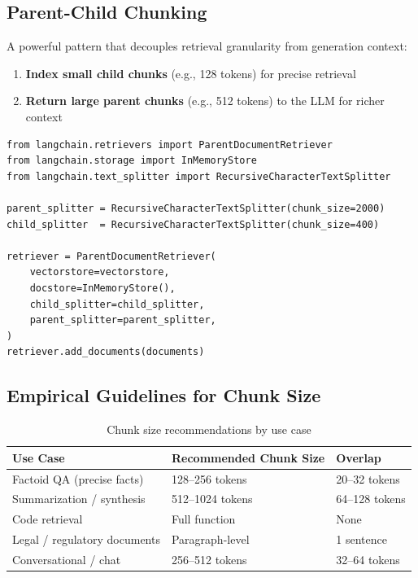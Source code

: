 \subsection{Parent-Child Chunking}
\label{parent-child-chunking}

A powerful pattern that decouples retrieval granularity from generation context:

\begin{enumerate}
  \item \textbf{Index small child chunks} (e.g., 128 tokens) for precise retrieval
  \item \textbf{Return large parent chunks} (e.g., 512 tokens) to the LLM for richer context
\end{enumerate}

\begin{lstlisting}[style=pythonstyle, caption={Parent-child chunking with LangChain}]
from langchain.retrievers import ParentDocumentRetriever
from langchain.storage import InMemoryStore
from langchain.text_splitter import RecursiveCharacterTextSplitter

parent_splitter = RecursiveCharacterTextSplitter(chunk_size=2000)
child_splitter  = RecursiveCharacterTextSplitter(chunk_size=400)

retriever = ParentDocumentRetriever(
    vectorstore=vectorstore,
    docstore=InMemoryStore(),
    child_splitter=child_splitter,
    parent_splitter=parent_splitter,
)
retriever.add_documents(documents)
\end{lstlisting}

\subsection{Empirical Guidelines for Chunk Size}
\label{empirical-guidelines-for-chunk-size}

\begin{table}[ht!]
\centering
\caption{Chunk size recommendations by use case}
\begin{tabular}{@{}lll@{}}
\toprule
\textbf{Use Case} & \textbf{Recommended Chunk Size} & \textbf{Overlap} \\
\midrule
Factoid QA (precise facts) & 128--256 tokens & 20--32 tokens \\
Summarization / synthesis & 512--1024 tokens & 64--128 tokens \\
Code retrieval & Full function & None \\
Legal / regulatory documents & Paragraph-level & 1 sentence \\
Conversational / chat & 256--512 tokens & 32--64 tokens \\
\bottomrule
\end{tabular}
\end{table}

